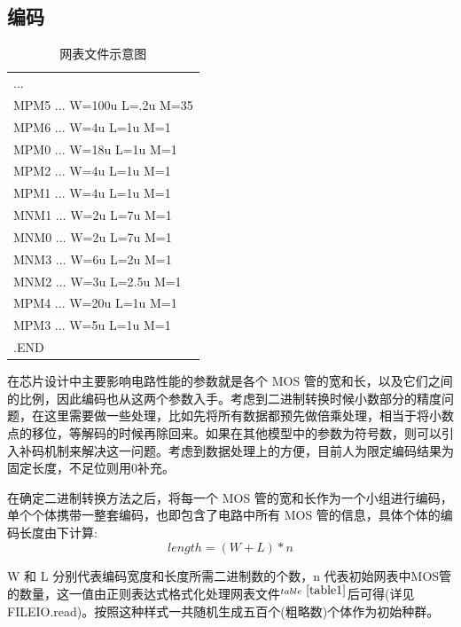 \documentclass[14pt, a4paper]{article}
\begin{document}
    \subsection{编码}
        \begin{table}[htbp]
            \centering
            \begin{tabular}{|l|}
                \hline
                ... \\
                MPM5 ... W=100u L=.2u M=35 \\
                MPM6 ... W=4u L=1u M=1 \\
                MPM0 ... W=18u L=1u M=1 \\
                MPM2 ... W=4u L=1u M=1 \\
                MPM1 ... W=4u L=1u M=1 \\
                MNM1 ... W=2u L=7u M=1 \\
                MNM0 ... W=2u L=7u M=1 \\
                MNM3 ... W=6u L=2u M=1 \\
                MNM2 ... W=3u L=2.5u M=1 \\
                MPM4 ... W=20u L=1u M=1 \\
                MPM3 ... W=5u L=1u M=1 \\
                .END \\
                \hline
            \end{tabular}
            \caption{网表文件示意图}
            \label{table1}
        \end{table}
        在芯片设计中主要影响电路性能的参数就是各个 MOS 管的宽和长，以及它们之间的比例，因此编码也从这两个参数入手。考虑到二进制转换时候小数部分的精度问题，在这里需要做一些处理，比如先将所有数据都预先做倍乘处理，相当于将小数点的移位，等解码的时候再除回来。如果在其他模型中的参数为符号数，则可以引入补码机制来解决这一问题。考虑到数据处理上的方便，目前人为限定编码结果为固定长度，不足位则用0补充。
        
        在确定二进制转换方法之后，将每一个 MOS 管的宽和长作为一个小组进行编码，单个个体携带一整套编码，也即包含了电路中所有 MOS 管的信息，具体个体的编码长度由下计算: \\
        $$length = (W + L) * n$$
        
        W 和 L 分别代表编码宽度和长度所需二进制数的个数，n 代表初始网表中MOS管的数量，这一值由正则表达式格式化处理网表文件$^{table\ \ref{table1}}$后可得(详见FILEIO.read)。按照这种样式一共随机生成五百个(粗略数)个体作为初始种群。
\end{document}
